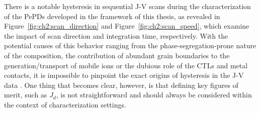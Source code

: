 There is a notable hysteresis in sequential J-V scans during the characterization of the PePDs developed in the framework of this thesis, as revealed in Figure~\ref{fig:ch2:scan_direction} and Figure~\ref{fig:ch2:scan_speed}, which examine the impact of scan direction and integration time, respectively. With the potential causes of this behavior ranging from the phase-segregation-prone nature of the  composition, the contribution of abundant grain boundaries to the generation/transport of mobile ions or the dubious role of the CTLs and metal contacts, it is impossible to pinpoint the exact origins of hysteresis in the J-V data \cite{Ghasemi2023APerovskites, Shao2016GrainFilms, Yun2016CriticalCells, Meggiolaro2019FormationPerovskites, Aristidou2017FastCells, Barker2017Defect-AssistedFilms,Li2018InorganicCells,Ighodalo2023NegligiblePerovskites}. One thing that becomes clear, however, is that defining key figures of merit, such as $J_d$, is not straightforward and should always be considered within the context of characterization settings.

